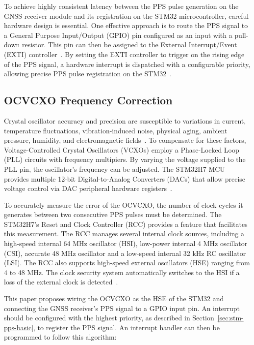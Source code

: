 \documentclass[12pt, a4paper]{extarticle}
\begin{document}
To achieve highly consistent latency between the PPS pulse generation on the
GNSS receiver module and its registration on the STM32 microcontroller, careful
hardware design is essential. One effective approach is to route the PPS signal
to a General Purpose Input/Output (GPIO) pin configured as an input with a
pull-down resistor. This pin can then be assigned to the External
Interrupt/Event (EXTI) controller~\cite{stm-ds}. By setting the EXTI controller
to trigger on the rising edge of the PPS signal, a hardware interrupt is
dispatched with a configurable priority, allowing precise PPS pulse registration
on the STM32~\cite{stm-pm}.

\subsection{OCVCXO Frequency Correction}

Crystal oscillator accuracy and precision are susceptible to variations in
current, temperature fluctuations, vibration-induced noise, physical aging,
ambient pressure, humidity, and electromagnetic fields~\cite{xo-stability}. To
compensate for these factors, Voltage-Controlled Crystal Oscillators (VCXOs)
employ a Phase-Locked Loop (PLL) circuits with frequency multipiers. By varying
the voltage supplied to the PLL pin, the oscillator's frequency can be
adjusted. The STM32H7 MCU provides multiple 12-bit Digital-to-Analog Converters
(DACs) that allow precise voltage control via DAC peripheral hardware
registers~\cite{stm-ds}.

To accurately measure the error of the OCVCXO, the number of clock cycles it
generates between two consecutive PPS pulses must be determined. The STM32H7's
Reset and Clock Controller (RCC) provides a feature that facilitates this
measurement. The RCC manages several internal clock sources, including a
high-speed internal 64 MHz oscillator (HSI), low-power internal 4 MHz
oscillator (CSI), accurate 48 MHz oscillator and a low-speed internal 32 kHz RC
oscillator (LSI). The RCC also supports high-speed external oscillators (HSE)
ranging from 4 to 48 MHz. The clock security system automatically switches to
the HSI if a loss of the external clock is detected~\cite{stm-ds}.

This paper proposes wiring the OCVCXO as the HSE of the STM32 and connecting
the GNSS receiver's PPS signal to a GPIO input pin. An interrupt should be
configured with the highest priority, as described in
Section~\ref{sec:stm-pps-basic}, to register the PPS signal. An interrupt
handler can then be programmed to follow this algorithm:
\end{document}
